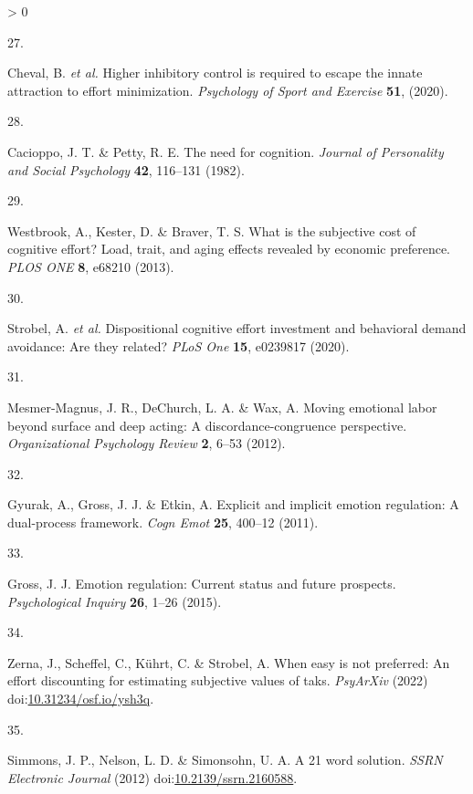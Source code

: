 \documentclass[
  english,
  man,floatsintext]{apa6}
\newlength{\cslhangindent}
\newlength{\csllabelwidth}
\newenvironment{CSLReferences}[2] %
 {%
  \setlength{\parindent}{0pt}
  \ifodd #1 \everypar{\setlength{\hangindent}{\cslhangindent}}\ignorespaces\fi
  \ifnum #2 > 0
  \setlength{\parskip}{#2\baselineskip}
  \fi
 }%
 {}
\newcommand{\CSLLeftMargin}[1]{\parbox[t]{\csllabelwidth}{#1}}
\newcommand{\CSLRightInline}[1]{\parbox[t]{\linewidth - \csllabelwidth}{#1}\break}
\begin{document}
\begin{CSLReferences}{0}{0}
\leavevmode\hypertarget{ref-Cheval2020}{}%
\CSLLeftMargin{27. }
\CSLRightInline{Cheval, B. \emph{et al.} Higher inhibitory control is required to escape the innate attraction to effort minimization. \emph{Psychology of Sport and Exercise} \textbf{51}, (2020).}

\leavevmode\hypertarget{ref-Cacioppo1982}{}%
\CSLLeftMargin{28. }
\CSLRightInline{Cacioppo, J. T. \& Petty, R. E. The need for cognition. \emph{Journal of Personality and Social Psychology} \textbf{42}, 116--131 (1982).}

\leavevmode\hypertarget{ref-Westbrook2013}{}%
\CSLLeftMargin{29. }
\CSLRightInline{Westbrook, A., Kester, D. \& Braver, T. S. What is the subjective cost of cognitive effort? {Load}, trait, and aging effects revealed by economic preference. \emph{PLOS ONE} \textbf{8}, e68210 (2013).}

\leavevmode\hypertarget{ref-Strobel2020}{}%
\CSLLeftMargin{30. }
\CSLRightInline{Strobel, A. \emph{et al.} Dispositional cognitive effort investment and behavioral demand avoidance: Are they related? \emph{PLoS One} \textbf{15}, e0239817 (2020).}

\leavevmode\hypertarget{ref-MesmerMagnus2012}{}%
\CSLLeftMargin{31. }
\CSLRightInline{Mesmer-Magnus, J. R., DeChurch, L. A. \& Wax, A. Moving emotional labor beyond surface and deep acting: A discordance-congruence perspective. \emph{Organizational Psychology Review} \textbf{2}, 6--53 (2012).}

\leavevmode\hypertarget{ref-Gyurak2011}{}%
\CSLLeftMargin{32. }
\CSLRightInline{Gyurak, A., Gross, J. J. \& Etkin, A. Explicit and implicit emotion regulation: A dual-process framework. \emph{Cogn Emot} \textbf{25}, 400--12 (2011).}

\leavevmode\hypertarget{ref-Gross2015}{}%
\CSLLeftMargin{33. }
\CSLRightInline{Gross, J. J. Emotion regulation: Current status and future prospects. \emph{Psychological Inquiry} \textbf{26}, 1--26 (2015).}

\leavevmode\hypertarget{ref-Zerna2022}{}%
\CSLLeftMargin{34. }
\CSLRightInline{Zerna, J., Scheffel, C., Kührt, C. \& Strobel, A. When easy is not preferred: An effort discounting for estimating subjective values of taks. \emph{PsyArXiv} (2022) doi:\href{https://doi.org/10.31234/osf.io/ysh3q}{10.31234/osf.io/ysh3q}.}

\leavevmode\hypertarget{ref-Simmons2012}{}%
\CSLLeftMargin{35. }
\CSLRightInline{Simmons, J. P., Nelson, L. D. \& Simonsohn, U. A. A 21 word solution. \emph{SSRN Electronic Journal} (2012) doi:\href{https://doi.org/10.2139/ssrn.2160588}{10.2139/ssrn.2160588}.}


\end{CSLReferences}
\end{document}

